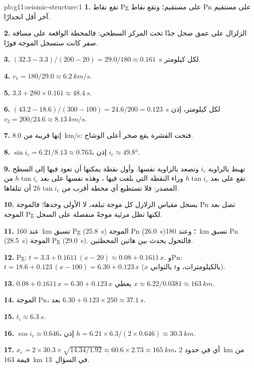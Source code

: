 \begin{solution}{pb:g11:seismic-structure:1}
\textbf{1.} تقع نقاط Pg على مستقيم؛ وتقع نقاط Pn على
مستقيم آخر أقل انحدارًا.

\textbf{2.} الزلزال على عمق ضحل جدًا تحت المركز السطحي:
فالمحطة الواقعة على مسافة صفر كانت ستسجل الموجة فورًا.

\textbf{3.} $(32.3 - 3.3)/(200 - 20) = 29.0/180 \approx \num{0.161}$~\unit{s}
لكل كيلومتر.

\textbf{4.} $v_1 = 180/29.0 \approx \qty{6.2}{km/s}$.

\textbf{5.} $3.3 + 280 \times 0.161 \approx \qty{48.4}{s}$.

\textbf{6.} $(43.2 - 18.6)/(300 - 100) = 24.6/200 = \num{0.123}$~\unit{s}
لكل كيلومتر، إذن $v_2 = 200/24.6 \approx \qty{8.13}{km/s}$.

\textbf{7.} إنها قريبة من \qty{8.0}{km/s}: فتحت القشرة يقع صخر
أعلى الوشاح.

\textbf{8.} $\sin i_c = 6.21/8.13 \approx 0.763$، إذن $i_c \approx
\ang{49.8}$.

\textbf{9.} تهبط  بالزاوية $i_c$ وتصعد
بالزاوية نفسها. وأول نقطة يمكنها أن تعود فيها إلى السطح تقع
على بعد $h\tan i_c$ وراء النقطة التي بلغت فيها ، وهذه نفسها على بعد $h\tan i_c$
من المصدر: فلا تستطيع أي محطة أقرب من $2h\tan i_c$ أن تتلقاها.

\textbf{10.} يسجل مقياس الزلازل كل موجة تبلغه، لا الأولى
وحدها؛ فالموجة Pn تصل بعد الموجة Pg لكنها تظل مرئية موجةً منفصلة
على السجل.

\textbf{11.} عند \qty{160}{km} تسبق Pg (\qty{25.8}{s}) الموجة Pn
(\qty{26.0}{s})؛ وعند \qty{180}{km} تسبق Pn (\qty{28.5}{s}) الموجة Pg
(\qty{29.0}{s}). فالتحول يحدث بين هاتين المحطتين.

\textbf{12.} Pg: $t = 3.3 + 0.1611\,(x - 20) \approx 0.08 + 0.1611\,x$. وPn:
$t = 18.6 + 0.123\,(x - 100) = 6.30 + 0.123\,x$ ($x$ بالكيلومترات، و$t$
بالثواني).

\textbf{13.} $0.08 + 0.1611\,x = 6.30 + 0.123\,x$ يعطي $x \approx
6.22/0.0381 \approx \qty{163}{km}$.

\textbf{14.} الموجة Pn، بعد $6.30 + 0.123 \times 250 \approx \qty{37.1}{s}$.

\textbf{15.} $t_i \approx \qty{6.3}{s}$.

\textbf{16.} $\cos i_c \approx 0.646$، إذن $h = 6.21 \times 6.3/(2 \times
0.646) \approx \qty{30.3}{km}$.

\textbf{17.} $x_c = 2 \times 30.3 \times \sqrt{14.34/1.92} \approx 60.6 \times
2.73 \approx \qty{165}{km}$، أي في حدود \qty{2}{km} من قيمة \qty{163}{km} في
السؤال~13.


\end{solution}

